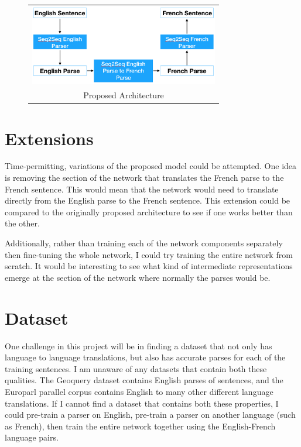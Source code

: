 \documentclass[11pt,twocolumn,letterpaper]{article}
\begin{document}
\begin{figure}[ht!]
    \begin{tabular}{c}
        \includegraphics[trim=0 0 0 0, clip, width=3.25in]{architecture.png} \\
        Proposed Architecture\\
    \end{tabular}
    \label{fig:architecture}
\end{figure}

\section{Extensions}
Time-permitting, variations of the proposed model could be attempted. One idea is removing the section of the network that translates the French parse to the French sentence. This would mean that the network would need to translate directly from the English parse to the French sentence. This extension could be compared to the originally proposed architecture to see if one works better than the other.

Additionally, rather than training each of the network components separately then fine-tuning the whole network, I could try training the entire network from scratch. It would be interesting to see what kind of intermediate representations emerge at the section of the network where normally the parses would be.

\section{Dataset}
One challenge in this project will be in finding a dataset that not only has language to language translations, but also has accurate parses for each of the training sentences. I am unaware of any datasets that contain both these qualities. The Geoquery dataset contains English parses of sentences, and the Europarl parallel corpus \cite{Europarl} contains English to many other different language translations. If I cannot find a dataset that contains both these properties, I could pre-train a parser on English, pre-train a parser on another language (such as French), then train the entire network together using the English-French language pairs.



{\small


}
\end{document}
